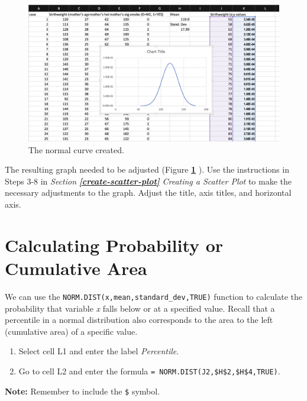 \documentclass[
  12pt,
  letterpaper,
]{book}
\providecommand{\tightlist}{%
  \setlength{\itemsep}{0pt}\setlength{\parskip}{0pt}}
\begin{document}
\begin{figure}

{\centering \includegraphics[width=1\linewidth]{images/normal-curve} 

}

\caption{The normal curve created.}\label{fig:normal-curve}
\end{figure}

The resulting graph needed to be adjusted (Figure \textbf{\ref{fig:normal-curve}
}). Use the instructions in Steps 3-8 in \emph{Section} \textbf{\emph{\ref{create-scatter-plot}}} \emph{Creating a Scatter Plot} to make the necessary adjustments to the graph. Adjust the title, axis titles, and horizontal axis.

\hypertarget{calculating-probability-or-cumulative-area}{%
\section{Calculating Probability or Cumulative Area}\label{calculating-probability-or-cumulative-area}}

We can use the \texttt{NORM.DIST(x,mean,standard\_dev,TRUE)} function to calculate the probability that variable \emph{x} falls below or at a specified value. Recall that a percentile in a normal distribution also corresponds to the area to the left (cumulative area) of a specific value.

\begin{enumerate}
\def\labelenumi{\arabic{enumi}.}
\tightlist
\item
  Select cell L1 and enter the label \emph{Percentile}.
\item
  Go to cell L2 and enter the formula \texttt{=\ NORM.DIST(J2,\$H\$2,\$H\$4,TRUE)}.
\end{enumerate}

\textbf{Note:} Remember to include the \texttt{\$} symbol.
\end{document}
